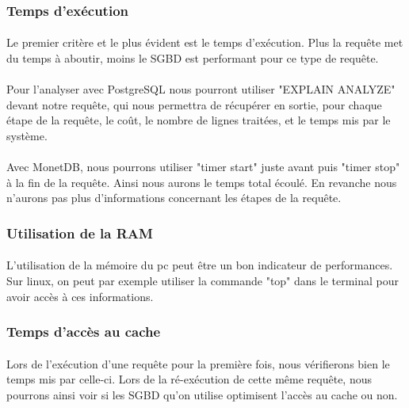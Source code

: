 \documentclass[11pt]{extarticle}
\begin{document}
\subsubsection{Temps d'exécution}
\paragraph{}
Le premier critère et le plus évident est le temps d'exécution. Plus la requête met du temps à aboutir, moins le SGBD est performant pour ce type de requête.

\paragraph{}
Pour l'analyser avec PostgreSQL nous pourront utiliser "EXPLAIN ANALYZE" devant notre requête, qui nous permettra de récupérer en sortie, pour chaque étape de la requête, le coût, le nombre de lignes traitées, et le temps mis par le système.

\paragraph{}
Avec MonetDB, nous pourrons utiliser "timer start" juste avant puis "timer stop" à la fin de la requête. Ainsi nous aurons le temps total écoulé. En revanche nous n'aurons pas plus d'informations concernant les étapes de la requête.

\subsubsection{Utilisation de la RAM}
\paragraph{}
L'utilisation de la mémoire du pc peut être un bon indicateur de performances. Sur linux, on peut par exemple utiliser la commande "top" dans le terminal pour avoir accès à ces informations.

\subsubsection{Temps d'accès au cache}
\paragraph{}
Lors de l'exécution d'une requête pour la première fois, nous vérifierons bien le temps mis par celle-ci. Lors de la ré-exécution de cette même requête, nous pourrons ainsi voir si les SGBD qu'on utilise optimisent l'accès au cache ou non.
\end{document}
